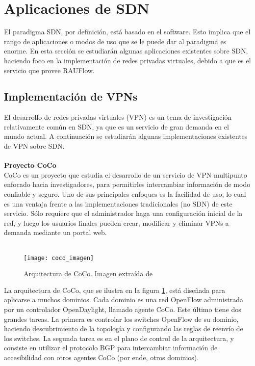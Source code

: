 \section{Aplicaciones de SDN}
El paradigma SDN, por definición, está basado en el software. Esto implica que el rango de aplicaciones o modos de uso que se le puede dar al paradigma es enorme. En esta sección se estudiarán algunas aplicaciones existentes sobre SDN, haciendo foco en la implementación de redes privadas virtuales, debido a que es el servicio que provee RAUFlow.
\subsection{Implementación de VPNs}
El desarrollo de redes privadas virtuales (VPN) es un tema de investigación relativamente común en SDN, ya que es un servicio de gran demanda en el mundo actual. A continuación se estudiarán algunas implementaciones existentes de VPN sobre SDN. \\ \\
\textbf{Proyecto CoCo} \\
CoCo \cite{coco-paper} es un proyecto que estudia el desarrollo de un servicio de VPN multipunto enfocado hacia investigadores, para permitirles intercambiar información de modo confiable y seguro. Uno de sus principales enfoques es la facilidad de uso, lo cual es una ventaja frente a las implementaciones tradicionales (no SDN) de este servicio. Sólo requiere que el administrador haga una configuración inicial de la red, y luego los usuarios finales pueden crear, modificar y  eliminar VPNs a demanda mediante un portal web. \\ \\
\begin{figure}[t]
	\caption{Arquitectura de CoCo. Imagen extraída de \cite{coco-paper}}
	\texttt{[image: coco\_imagen]}
	\centering
	\label{fig:coco_imagen}
\end{figure}
La arquitectura de CoCo, que se ilustra en la figura \ref{fig:coco_imagen}, está diseñada para aplicarse a muchos dominios. Cada dominio es una red OpenFlow administrada por un controlador OpenDaylight, llamado agente CoCo. Este último tiene dos grandes tareas. La primera es controlar los switches OpenFlow de su dominio, haciendo descubrimiento de la topología y configurando las reglas de reenvío de los switches. La segunda tarea es en el plano de control de la arquitectura, y consiste en utilizar el protocolo BGP para intercambiar información de accesibilidad con otros agentes CoCo (por ende, otros dominios). \\ \\
